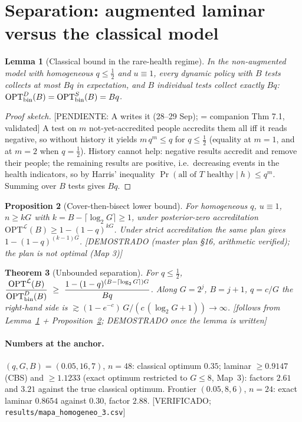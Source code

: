 \documentclass[11pt]{article}
\newtheorem{theorem}{Theorem}[section]
\newtheorem{lemma}[theorem]{Lemma}
\newtheorem{proposition}[theorem]{Proposition}
\theoremstyle{remark}
\newcommand{\status}[1]{\textcolor{blue!60!black}{\textsf{\small [#1]}}}
\newcommand{\OPT}{\mathrm{OPT}}
\newcommand{\Lam}{\mathcal L}
\begin{document}
\section{Separation: augmented laminar versus the classical model}\label{sec:sep}

\begin{lemma}[Classical bound in the rare-health regime]\label{lem:classical}
In the non-augmented model with homogeneous $q\le\tfrac12$ and $u\equiv1$, every dynamic policy with $B$ tests collects at most $Bq$ in expectation, and $B$ individual tests collect exactly $Bq$: $\OPT^{D}_{\rm bin}(B)=\OPT^{S}_{\rm bin}(B)=Bq$.
\end{lemma}
\begin{proof}[Proof sketch] \status{PENDIENTE: A writes it (28--29 Sep); = companion Thm 7.1, validated}
A test on $m$ not-yet-accredited people accredits them all iff it reads negative, so without history it yields $m\,q^m\le q$ for $q\le\tfrac12$ (equality at $m=1$, and at $m=2$ when $q=\tfrac12$). History cannot help: negative results accredit and remove their people; the remaining results are positive, i.e.\ decreasing events in the health indicators, so by Harris' inequality $\Pr(\text{all of }T\text{ healthy}\mid h)\le q^{m}$. Summing over $B$ tests gives $Bq$.
\end{proof}

\begin{proposition}[Cover-then-bisect lower bound]\label{prop:cbs}
For homogeneous $q$, $u\equiv1$, $n\ge kG$ with $k=B-\lceil\log_2 G\rceil\ge1$, under posterior-zero accreditation $\OPT^{\Lam}(B)\ge 1-(1-q)^{kG}$. Under strict accreditation the same plan gives $1-(1-q)^{(k-1)G}$. \status{DEMOSTRADO (master plan §16, arithmetic verified); the plan is not optimal (Map 3)}
\end{proposition}

\begin{theorem}[Unbounded separation]\label{thm:sep}
For $q\le\tfrac12$, $\displaystyle \frac{\OPT^{\Lam}(B)}{\OPT^{D}_{\rm bin}(B)}\ \ge\ \frac{1-(1-q)^{(B-\lceil\log_2G\rceil)G}}{Bq}$. Along $G=2^j$, $B=j+1$, $q=c/G$ the right-hand side is $\gtrsim (1-e^{-c})\,G/(c\,(\log_2G+1))\to\infty$. \status{follows from Lemma~\ref{lem:classical} + Proposition~\ref{prop:cbs}; DEMOSTRADO once the lemma is written}
\end{theorem}

\paragraph{Numbers at the anchor.} $(q,G,B)=(0.05,16,7)$, $n=48$: classical optimum $0.35$; laminar $\ge0.9147$ (CBS) and $\ge1.1233$ (exact optimum restricted to $G\le8$, Map~3): factors $2.61$ and $3.21$ against the true classical optimum. Frontier $(0.05,8,6)$, $n=24$: exact laminar $0.8654$ against $0.30$, factor $2.88$. \status{VERIFICADO; \texttt{results/mapa\_homogeneo\_3.csv}}
\end{document}
